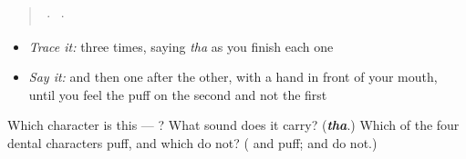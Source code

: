 \begin{quote}
  ·    ·  
\end{quote}

\begin{itemize}
\raggedright
  \item \emph{Trace it:}  three times, saying \emph{tha} as you finish each one
  \item \emph{Say it:}  and then  one after the other, with a hand in front of your mouth, until you feel the puff on the second and not the first
\end{itemize}

\begin{tcolorbox}[breakable,colback=teal!4,colframe=teal!35!black,title={Before you move on}]
Which character is this — ? What sound does it carry? (\emph{\textbf{tha}}.) Which of the four dental characters puff, and which do not? ( and  puff;  and  do not.)
\end{tcolorbox}
